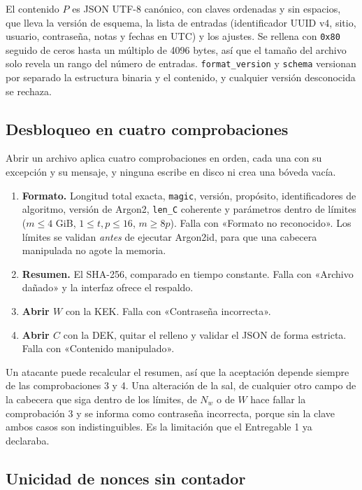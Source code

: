 \documentclass[11pt,letterpaper]{article}
\newcommand{\code}[1]{\texttt{#1}}
\begin{document}
El contenido $P$ es JSON UTF-8 canónico, con claves ordenadas y sin espacios, que lleva la versión de esquema, la lista de entradas (identificador UUID v4, sitio, usuario, contraseña, notas y fechas en UTC) y los ajustes. Se rellena con \code{0x80} seguido de ceros hasta un múltiplo de 4096 bytes, así que el tamaño del archivo solo revela un rango del número de entradas. \code{format\_version} y \code{schema} versionan por separado la estructura binaria y el contenido, y cualquier versión desconocida se rechaza.

\subsection{Desbloqueo en cuatro comprobaciones}

Abrir un archivo aplica cuatro comprobaciones en orden, cada una con su excepción y su mensaje, y ninguna escribe en disco ni crea una bóveda vacía.
\begin{enumerate}
\item \textbf{Formato.} Longitud total exacta, \code{magic}, versión, propósito, identificadores de algoritmo, versión de Argon2, \code{len\_C} coherente y parámetros dentro de límites ($m \le 4$ GiB, $1 \le t, p \le 16$, $m \ge 8p$). Falla con «Formato no reconocido». Los límites se validan \emph{antes} de ejecutar Argon2id, para que una cabecera manipulada no agote la memoria.
\item \textbf{Resumen.} El SHA-256, comparado en tiempo constante. Falla con «Archivo dañado» y la interfaz ofrece el respaldo.
\item \textbf{Abrir $W$} con la KEK. Falla con «Contraseña incorrecta».
\item \textbf{Abrir $C$} con la DEK, quitar el relleno y validar el JSON de forma estricta. Falla con «Contenido manipulado».
\end{enumerate}
Un atacante puede recalcular el resumen, así que la aceptación depende siempre de las comprobaciones 3 y 4. Una alteración de la sal, de cualquier otro campo de la cabecera que siga dentro de los límites, de $N_w$ o de $W$ hace fallar la comprobación 3 y se informa como contraseña incorrecta, porque sin la clave ambos casos son indistinguibles. Es la limitación que el Entregable 1 ya declaraba.

\subsection{Unicidad de nonces sin contador}
\end{document}
